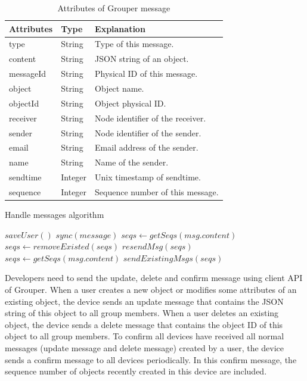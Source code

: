 \documentclass[twocolumn,10pt]{article}
\begin{document}
\begin{table}[t]
	\centering
	\caption{Attributes of Grouper message}
	\label{my-label}
	\begin{tabular}{lll}
		\hline
		\textbf{Attributes} & \textbf{Type} & \textbf{Explanation} \\ \hline
		type & String & Type of this message. \\
		content & String & JSON string of an object. \\
		messageId & String & Physical ID of this message. \\
		object & String & Object name. \\
		objectId & String & Object physical ID. \\
		receiver & String & Node identifier of the receiver. \\
		sender & String & Node identifier of the sender. \\
		email & String & Email address of the sender. \\
		name & String & Name of the sender. \\
		sendtime & Integer & Unix timestamp of sendtime. \\
		sequence & Integer & Sequence number of this message. \\ \hline
	\end{tabular}
\end{table}

\begin{algorithm}[t]
	\caption{Handle messages algorithm}\label{alg:euclid}
	\begin{algorithmic}[1]		
		\State $saveUser()$
		\EndIf
		\State $sync(message)$
		\State $seqs \gets getSeqs(msg.content)$
		\State $seqs \gets removeExisted(seqs)$
		\State $resendMsg(seqs)$
		\State $seqs \gets getSeqs(msg.content)$
		\State $sendExistingMsgs(seqs)$
		\EndIf
		\EndIf
		\EndFor
		\EndProcedure
	\end{algorithmic}
\end{algorithm}

Developers need to send the update, delete and confirm message using client API of Grouper.
When a user creates a new object or modifies some attributes of an existing object, the device sends an update message that contains the JSON string of this object to all group members.
When a user deletes an existing object, the device sends a delete message that contains the object ID of this object to all group members.
To confirm all devices have received all normal messages (update message and delete message) created by a user, the device sends a confirm message to all devices periodically.
In this confirm message, the sequence number of objects recently created in this device are included.
\end{document}
